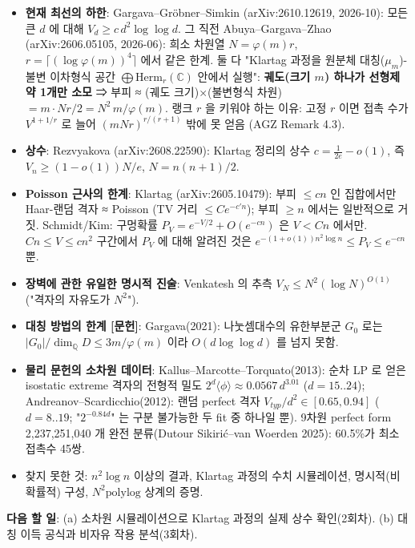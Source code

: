 \begin{itemize}
\tightlist
\item
  \textbf{현재 최선의 하한}: Gargava--Gröbner--Simkin (arXiv:2610.12619, 2026-10): 모든 큰 \(d\) 에 대해 \(V_d\ge c\,d^2\log\log d\). 그 직전 Abuya--Gargava--Zhao (arXiv:2606.05105, 2026-06): 희소 차원열 \(N=\varphi(m)r\), \(r=\lceil(\log\varphi(m))^4\rceil\) 에서 같은 한계. 둘 다 "Klartag 과정을 원분체 대칭(\(\mu_m\))-불변 이차형식 공간 \(\bigoplus \mathrm{Herm}_r(\mathbb C)\) 안에서 실행": \textbf{궤도(크기 \(m\)) 하나가 선형제약 1개만 소모} ⇒ 부피 ≈ (궤도 크기)×(불변형식 차원) \(= m\cdot Nr/2 = N^2\,m/\varphi(m)\). 랭크 \(r\) 을 키워야 하는 이유: 고정 \(r\) 이면 접촉 수가 \(V^{1+1/r}\) 로 늘어 \((mNr)^{r/(r+1)}\) 밖에 못 얻음 (AGZ Remark 4.3).
\item
  \textbf{상수}: Rezvyakova (arXiv:2608.22590): Klartag 정리의 상수 \(c=\tfrac1{2e}-o(1)\), 즉 \(V_n\ge(1-o(1))N/e\), \(N=n(n+1)/2\).
\item
  \textbf{Poisson 근사의 한계}: Klartag (arXiv:2605.10479): 부피 \(\le cn\) 인 집합에서만 Haar-랜덤 격자 ≈ Poisson (TV 거리 \(\le Ce^{-c'n}\)); 부피 \(\ge n\) 에서는 일반적으로 거짓. Schmidt/Kim: 구멍확률 \(P_V=e^{-V/2}+O(e^{-cn})\) 은 \(V<Cn\) 에서만. \(Cn\le V\le cn^2\) 구간에서 \(P_V\) 에 대해 알려진 것은 \(e^{-(1+o(1))n^2\log n}\le P_V\le e^{-cn}\) 뿐.
\item
  \textbf{장벽에 관한 유일한 명시적 진술}: Venkatesh 의 추측 \(V_N\le N^2(\log N)^{O(1)}\) ("격자의 자유도가 \(N^2\)").
\item
  \textbf{대칭 방법의 한계 {[}문헌{]}}: Gargava(2021): 나눗셈대수의 유한부분군 \(G_0\) 로는 \(|G_0|/\dim_\mathbb Q D\le 3m/\varphi(m)\) 이라 \(O(d\log\log d)\) 를 넘지 못함.
\item
  \textbf{물리 문헌의 소차원 데이터}: Kallus--Marcotte--Torquato(2013): 순차 LP 로 얻은 isostatic extreme 격자의 전형적 밀도 \(2^d\langle\phi\rangle\approx0.0567\,d^{3.01}\) (\(d=15..24\)); Andreanov--Scardicchio(2012): 랜덤 perfect 격자 \(V_{typ}/d^2\in[0.65,0.94]\) (\(d=8..19\); "\(2^{-0.84d}\)" 는 구분 불가능한 두 fit 중 하나일 뿐). 9차원 perfect form 2,237,251,040 개 완전 분류(Dutour Sikirić--van Woerden 2025): 60.5\%가 최소 접촉수 45쌍.
\item
  찾지 못한 것: \(n^2\log n\) 이상의 결과, Klartag 과정의 수치 시뮬레이션, 명시적(비확률적) 구성, \(N^2\mathrm{polylog}\) 상계의 증명.
\end{itemize}

\textbf{다음 할 일}: (a) 소차원 시뮬레이션으로 Klartag 과정의 실제 상수 확인(2회차). (b) 대칭 이득 공식과 비자유 작용 분석(3회차).

